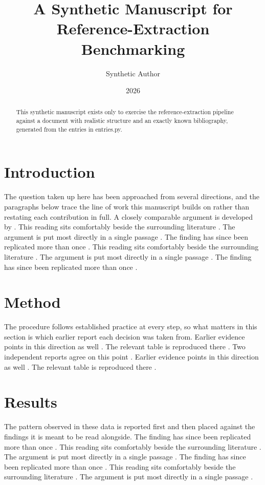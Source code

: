 \documentclass{article}
\title{A Synthetic Manuscript for Reference-Extraction Benchmarking}
\author{Synthetic Author}
\date{2026}
\begin{document}
\maketitle

\begin{abstract}
This synthetic manuscript exists only to exercise the reference-extraction pipeline against a document with realistic structure and an exactly known bibliography, generated from the entries in entries.py.
\end{abstract}

\section{Introduction}
The question taken up here has been approached from several directions, and the paragraphs below trace the line of work this manuscript builds on rather than restating each contribution in full. A closely comparable argument is developed by \textcite{shannon1948mathematical}. This reading sits comfortably beside the surrounding literature \parencite{vaswani2017attention}. The argument is put most directly in a single passage \parencite[p.~14]{rcoreteam2024r}. The finding has since been replicated more than once \parencite{turing1950computing,codd1970relational}. This reading sits comfortably beside the surrounding literature \parencite{lamport1978time}. The argument is put most directly in a single passage \parencite[p.~14]{rivest1978method}. The finding has since been replicated more than once \parencite{lecun1998gradient,diffiehellman1976new}.

\section{Method}
The procedure follows established practice at every step, so what matters in this section is which earlier report each decision was taken from. Earlier evidence points in this direction as well \parencite{krizhevsky2012imagenet}. The relevant table is reproduced there \parencite[p.~87]{dijkstra1968goto}. Two independent reports agree on this point \parencite{knuth1968art,church1936unsolvable}. Earlier evidence points in this direction as well \parencite{vonneumann1945firstdraft}. The relevant table is reproduced there \parencite[p.~87]{bernerslee1994worldwideweb}.

\section{Results}
The pattern observed in these data is reported first and then placed against the findings it is meant to be read alongside. The finding has since been replicated more than once \parencite{cerfkahn1974protocol,metropolis1953equation}. This reading sits comfortably beside the surrounding literature \parencite{hopcrofttarjan1973efficient}. The argument is put most directly in a single passage \parencite[p.~14]{cormen2009introduction}. The finding has since been replicated more than once \parencite{hopper1952education,engelbart1968research}. This reading sits comfortably beside the surrounding literature \parencite{ritchiethompson1974unix}. The argument is put most directly in a single passage \parencite[p.~14]{backus1978can}.
\end{document}
